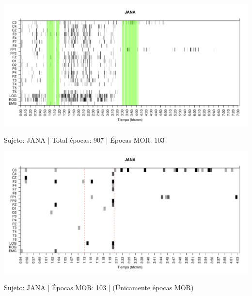 \begin{SidewaysFigure}
\centering
\includegraphics[width=\linewidth]
{./material_bonito170220/JANASUE_103_mor103_tot907_est_total.pdf} 
\caption{Sujeto: JANA | Total \'epocas: 907 | \'Epocas MOR: 103}
\end{SidewaysFigure}
\begin{SidewaysFigure}
\centering
\includegraphics[width=\linewidth]
{./material_bonito170220/JANASUE_103_mor103_tot103_est_mor.pdf} 
\caption{Sujeto: JANA | \'Epocas MOR: 103 | (\'Unicamente \'epocas MOR)}
\end{SidewaysFigure}


